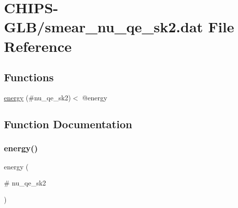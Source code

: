 \hypertarget{smear__nu__qe__sk2_8dat}{}\section{C\+H\+I\+P\+S-\/\+G\+L\+B/smear\+\_\+nu\+\_\+qe\+\_\+sk2.dat File Reference}
\label{smear__nu__qe__sk2_8dat}
\subsection*{Functions}
\begin{DoxyCompactItemize}
\item 
\hyperlink{smear__nu__qe__sk2_8dat_a70c79859eb3ee06ca2f4ec30d0d001e3}{energy} (\#nu\+\_\+qe\+\_\+sk2)$<$ @energy
\end{DoxyCompactItemize}


\subsection{Function Documentation}
\mbox{\label{smear__nu__qe__sk2_8dat_a70c79859eb3ee06ca2f4ec30d0d001e3}} 
\subsubsection{\texorpdfstring{energy()}{energy()}}
{\footnotesize\ttfamily energy (\begin{DoxyParamCaption}\item[{\#}]{nu\+\_\+qe\+\_\+sk2 }\end{DoxyParamCaption})}

